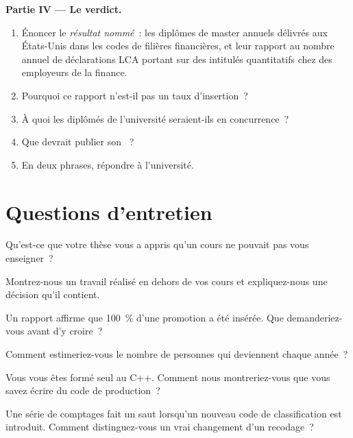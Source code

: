 \begin{problem}
\medskip\noindent\textbf{Partie IV --- Le verdict.}
\begin{enumerate}[resume]
\item Énoncer le \emph{résultat nommé}~: les diplômes de master annuels délivrés aux États-Unis dans les codes de filières financières, et leur rapport
au nombre annuel de déclarations LCA portant sur des intitulés quantitatifs chez des employeurs de la finance.
\item Pourquoi ce rapport n'est-il pas un taux d'insertion~?
\item À quoi les diplômés de l'université seraient-ils en concurrence~?
\item Que devrait publier son ~?
\item En deux phrases, répondre à l'université.
\end{enumerate}
\end{problem}

\section{Questions d'entretien}

\begin{interviewq}\label{iq:in:education-pipelines:1}
Qu'est-ce que votre thèse vous a appris qu'un cours ne pouvait pas vous enseigner~?
\end{interviewq}

\begin{interviewq}\label{iq:in:education-pipelines:2}
Montrez-nous un travail réalisé en dehors de vos cours et expliquez-nous une décision qu'il contient.
\end{interviewq}

\begin{interviewq}\label{iq:in:education-pipelines:3}
Un rapport affirme que 100~\% d'une promotion a été insérée. Que demanderiez-vous avant d'y croire~?
\end{interviewq}

\begin{interviewq}\label{iq:in:education-pipelines:4}
Comment estimeriez-vous le nombre de personnes qui deviennent  chaque année~?
\end{interviewq}

\begin{interviewq}\label{iq:in:education-pipelines:5}
Vous vous êtes formé seul au C++. Comment nous montreriez-vous que vous savez écrire du code de production~?
\end{interviewq}

\begin{interviewq}\label{iq:in:education-pipelines:6}
Une série de comptages fait un saut lorsqu'un nouveau code de classification est introduit. Comment distinguez-vous un vrai changement d'un recodage~?
\end{interviewq}
